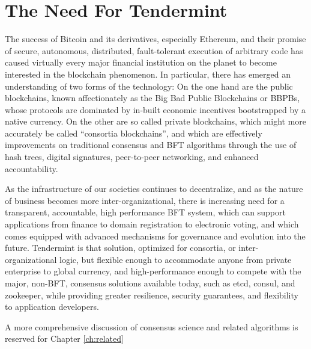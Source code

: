 \section{The Need For Tendermint}

The success of Bitcoin and its derivatives, especially Ethereum, and their promise of secure, autonomous, distributed, fault-tolerant execution of arbitrary code has caused virtually every major financial institution on the planet to become interested in the blockchain phenomenon. 
In particular, there has emerged an understanding of two forms of the technology:
On the one hand are the public blockchains, known affectionately as the Big Bad Public Blockchains or BBPBs, 
whose protocols are dominated by in-built economic incentives bootstrapped by a native currency.
On the other are so called private blockchains, which might more accurately be called ``consortia blockchains'',
and which are effectively improvements on traditional consensus and BFT algorithms through the use of hash trees, digital signatures, 
peer-to-peer networking, and enhanced accountability.

As the infrastructure of our societies continues to decentralize, and as the nature of business becomes more inter-organizational,
there is increasing need for a transparent, accountable, high performance BFT system, which can support applications from finance to domain registration to electronic voting,
and which comes equipped with advanced mechanisms for governance and evolution into the future.
Tendermint is that solution, optimized for consortia, or inter-organizational logic, but flexible enough to accommodate anyone from private enterprise to global currency,
and high-performance enough to compete with the major, non-BFT, consensus solutions available today, such as etcd, consul, and zookeeper, while providing greater resilience, security guarantees, and flexibility to application developers.

A more comprehensive discussion of consensus science and related algorithms is reserved for Chapter \ref{ch:related}

